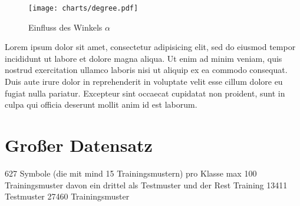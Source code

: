 \begin{figure}[htbp]
  \begin{center}
    \texttt{[image: charts/degree.pdf]}
  \end{center}
  \caption{Einfluss des Winkels $\alpha$}
  \label{chart:degree}
\end{figure}

Lorem ipsum dolor sit amet, consectetur adipisicing elit, sed do eiusmod tempor incididunt ut labore et dolore magna aliqua. Ut enim ad minim veniam, quis nostrud exercitation ullamco laboris nisi ut aliquip ex ea commodo consequat. Duis aute irure dolor in reprehenderit in voluptate velit esse cillum dolore eu fugiat nulla pariatur. Excepteur sint occaecat cupidatat non proident, sunt in culpa qui officia deserunt mollit anim id est laborum.

\section{Großer Datensatz}
\label{sec:kleiner_datensatz}


627 Symbole (die mit mind 15 Trainingsmustern) pro Klasse max 100 Trainingsmuster davon ein drittel als Testmuster und der Rest Training
13411 Testmuster
27460 Trainingsmuster